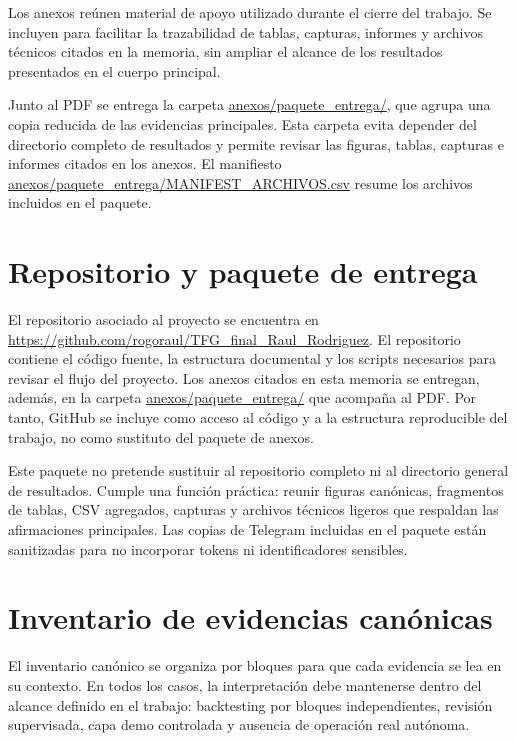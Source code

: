 Los anexos re\'unen material de apoyo utilizado durante el cierre del trabajo.
Se incluyen para facilitar la trazabilidad de tablas, capturas, informes y
archivos t\'ecnicos citados en la memoria, sin ampliar el alcance de los
resultados presentados en el cuerpo principal.

Junto al PDF se entrega la carpeta \url{anexos/paquete_entrega/}, que agrupa una
copia reducida de las evidencias principales. Esta carpeta evita depender del
directorio completo de resultados y permite revisar las figuras, tablas,
capturas e informes citados en los anexos. El manifiesto
\url{anexos/paquete_entrega/MANIFEST_ARCHIVOS.csv} resume los archivos incluidos
en el paquete.

\section{Repositorio y paquete de entrega}
\label{sec:anexos-repositorio-paquete}

El repositorio asociado al proyecto se encuentra en
\url{https://github.com/rogoraul/TFG_final_Raul_Rodriguez}. El repositorio
contiene el c\'odigo fuente, la estructura documental y los scripts necesarios
para revisar el flujo del proyecto. Los anexos citados en esta memoria se
entregan, adem\'as, en la carpeta \url{anexos/paquete_entrega/} que acompa\~na
al PDF. Por tanto, GitHub se incluye como acceso al c\'odigo y a la estructura
reproducible del trabajo, no como sustituto del paquete de anexos.

Este paquete no pretende sustituir al repositorio completo ni al directorio
general de resultados. Cumple una funci\'on pr\'actica: reunir figuras can\'onicas,
fragmentos de tablas, CSV agregados, capturas y archivos t\'ecnicos ligeros que
respaldan las afirmaciones principales. Las copias de Telegram incluidas en el
paquete est\'an sanitizadas para no incorporar tokens ni identificadores
sensibles.

\section{Inventario de evidencias can\'onicas}
\label{sec:anexos-inventario-evidencias}

El inventario can\'onico se organiza por bloques para que cada evidencia se lea
en su contexto. En todos los casos, la interpretaci\'on debe mantenerse dentro
del alcance definido en el trabajo: backtesting por bloques independientes,
revisi\'on supervisada, capa demo controlada y ausencia de operaci\'on real
aut\'onoma.


